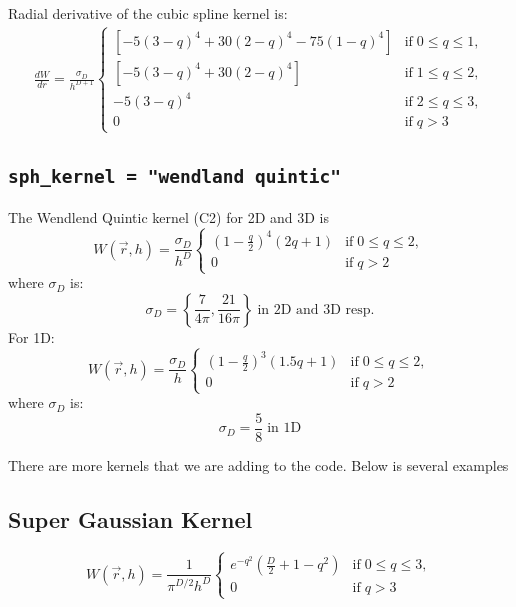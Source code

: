 \documentclass[notes.tex]{subfiles}
\begin{document}
Radial derivative of the cubic spline kernel is:
\begin{align}
 \frac{dW}{dr} = \frac{\sigma_D}{h^{D+1}} 
  \begin{cases}
    [-5(3-q)^4+30(2-q)^4-75(1-q)^4] & \text{if} \; 0 \leq q \leq 1, \\
    [-5(3-q)^4 + 30(2-q)^4] & \text{if} \; 1 \leq q \leq 2, \\
   -5(3-q)^4 & \text{if} \; 2 \leq q \leq 3, \\
    0        & \text{if} \;  q >3 
\end{cases}
\end{align}


\subsection{{\tt sph\_kernel = "wendland quintic"}}
The Wendlend Quintic kernel (C2) for 2D and 3D is
\begin{equation}
W(\vec{r},h) = \frac{\sigma_D}{h^D} 
  \begin{cases}
    \left(1-\frac{q}{2} \right)^4 (2q+1) & \text{if} \; 0 \leq q \leq 2, \\
    0        & \text{if} \;  q > 2 
\end{cases}
\end{equation}
where $\sigma_D$ is:
\begin{equation}
\sigma_D =  \left\{ \frac{7}{4 \pi}, \frac{21}{16\pi}\right\}
         \; \text{in 2D and 3D resp.}
\end{equation}
For 1D:
\begin{equation}
W(\vec{r},h) = \frac{\sigma_D}{h} 
  \begin{cases}
    \left(1-\frac{q}{2} \right)^3 (1.5q+1) & \text{if} \; 0 \leq q \leq 2, \\
    0        & \text{if} \;  q > 2 
\end{cases}
\end{equation}
where $\sigma_D$ is:
\begin{equation}
\sigma_D =  \frac{5}{8}
         \; \text{in 1D}
\end{equation}


There are more kernels that we are adding to the code. Below is several examples
\subsection{Super Gaussian Kernel}
\begin{equation}
W(\vec{r},h) = \frac{1}{\pi^{D/2} h^D} 
  \begin{cases}
    e^{-q^2} \left(\frac{D}{2} + 1 - q^2 \right) & \text{if} \; 0 \leq q \leq 3, \\
    0        & \text{if} \;  q >3 
    \end{cases}
\end{equation}
\end{document}
